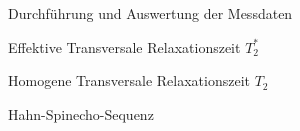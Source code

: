 \documentclass[pdftex, a4paper,11pt, twoside, ngerman]{report}
\begin{document}
\begin{chapter}{Durchführung und Auswertung der Messdaten}
\begin{section}{
        Effektive Transversale Relaxationszeit $T_{2}^{*}$}
    \end{section}
    
    
    
    \begin{section}{
        Homogene Transversale Relaxationszeit $T_{2}$}
      \label{chpHomoTransRelax}
      
      
      \begin{subsection}{Hahn-Spinecho-Sequenz}
        \label{chpHomoTransRelaxHahn}
        
        
        

\end{subsection}
\end{section}
\end{chapter}
\end{document}
